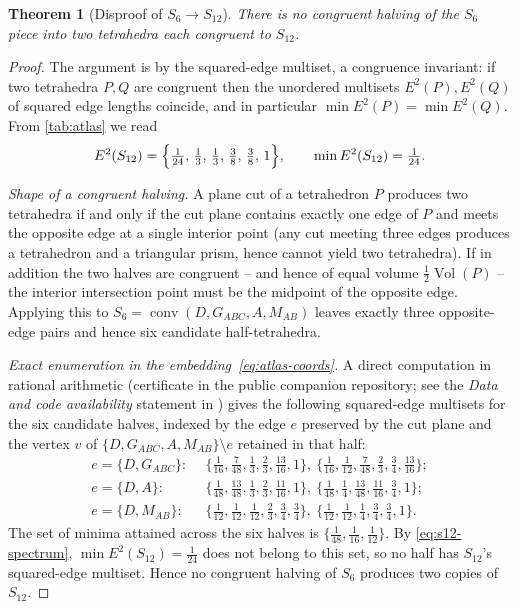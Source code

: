 \documentclass[11pt,a4paper]{article}
\theoremstyle{plain}
\newtheorem{theorem}{Theorem}[section]
\theoremstyle{definition}
\theoremstyle{remark}
\DeclareMathOperator{\Vol}{Vol}
\DeclareMathOperator{\conv}{conv}
\begin{document}
\begin{theorem}[Disproof of $S_{6} \to S_{12}$]\label{thm:s6-s12-fail}
There is no congruent halving of the $S_{6}$ piece into two tetrahedra
each congruent to $S_{12}$.
\end{theorem}

\begin{proof}
The argument is by the squared-edge multiset, a congruence invariant:
if two tetrahedra $P, Q$ are congruent then the unordered multisets
$E^{2}(P), E^{2}(Q)$ of squared edge lengths coincide, and in particular
$\min E^{2}(P) = \min E^{2}(Q)$.  From \cref{tab:atlas} we read
\begin{equation}\label{eq:s12-spectrum}
  E^{2}(S_{12}) = \Bigl\{\tfrac{1}{24},\,\tfrac13,\,\tfrac13,\,\tfrac38,\,\tfrac38,\,1\Bigr\},
  \qquad \min E^{2}(S_{12}) = \tfrac{1}{24}.
\end{equation}

\smallskip\noindent\emph{Shape of a congruent halving.}
A plane cut of a tetrahedron $P$ produces two tetrahedra if and only if
the cut plane contains exactly one edge of $P$ and meets the opposite
edge at a single interior point (any cut meeting three edges produces a
tetrahedron and a triangular prism, hence cannot yield two tetrahedra).
If in addition the two halves are congruent -- and hence of equal
volume $\tfrac12\Vol(P)$ -- the interior intersection point must be the
midpoint of the opposite edge.  Applying this to
$S_{6} = \conv(D, G_{ABC}, A, M_{AB})$ leaves exactly three opposite-edge
pairs and hence six candidate half-tetrahedra.

\smallskip\noindent\emph{Exact enumeration in the embedding~\eqref{eq:atlas-coords}.}
A direct computation in rational arithmetic (certificate
 in the public companion
repository; see the \emph{Data and code availability} statement in
)
gives the
following squared-edge multisets for the six candidate halves, indexed
by the edge $e$ preserved by the cut plane and the vertex $v$ of
$\{D, G_{ABC}, A, M_{AB}\} \setminus e$ retained in that half:
\begin{align*}
  e = \{D,G_{ABC}\}:\ &\ \bigl\{\tfrac{1}{16}, \tfrac{7}{48}, \tfrac13, \tfrac23, \tfrac{13}{16}, 1\bigr\},\
  \bigl\{\tfrac{1}{16}, \tfrac{1}{12}, \tfrac{7}{48}, \tfrac23, \tfrac34, \tfrac{13}{16}\bigr\}; \\
  e = \{D,A\}:\        &\ \bigl\{\tfrac{1}{48}, \tfrac{13}{48}, \tfrac13, \tfrac23, \tfrac{11}{16}, 1\bigr\},\
  \bigl\{\tfrac{1}{48}, \tfrac14, \tfrac{13}{48}, \tfrac{11}{16}, \tfrac34, 1\bigr\}; \\
  e = \{D,M_{AB}\}:\   &\ \bigl\{\tfrac{1}{12}, \tfrac{1}{12}, \tfrac{1}{12}, \tfrac23, \tfrac34, \tfrac34\bigr\},\
  \bigl\{\tfrac{1}{12}, \tfrac{1}{12}, \tfrac14, \tfrac34, \tfrac34, 1\bigr\}.
\end{align*}
The set of minima attained across the six halves is
$\{\tfrac{1}{48}, \tfrac{1}{16}, \tfrac{1}{12}\}$.  By
\eqref{eq:s12-spectrum}, $\min E^{2}(S_{12}) = \tfrac{1}{24}$ does not
belong to this set, so no half has $S_{12}$'s squared-edge multiset.
Hence no congruent halving of $S_{6}$ produces two copies of $S_{12}$.
\end{proof}
\end{document}
